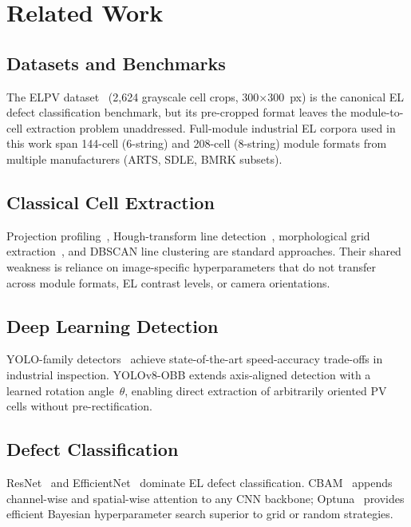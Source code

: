 \documentclass[conference]{IEEEtran}
\begin{document}
\section{Related Work}

\subsection{Datasets and Benchmarks}
The ELPV dataset~\cite{deitsch2019} (2{,}624 grayscale cell
crops, 300$\times$300~px) is the canonical EL defect
classification benchmark, but its pre-cropped format leaves
the module-to-cell extraction problem unaddressed.
Full-module industrial EL corpora used in this work span
144-cell (6-string) and 208-cell (8-string) module formats
from multiple manufacturers (ARTS, SDLE, BMRK subsets).

\subsection{Classical Cell Extraction}
Projection profiling~\cite{wong1982}, Hough-transform line
detection~\cite{duda1972}, morphological grid
extraction~\cite{soille2003}, and DBSCAN line clustering are
standard approaches. Their shared weakness is reliance on
image-specific hyperparameters that do not transfer across
module formats, EL contrast levels, or camera orientations.

\subsection{Deep Learning Detection}
YOLO-family detectors~\cite{redmon2016,jocher2023} achieve
state-of-the-art speed-accuracy trade-offs in industrial
inspection. YOLOv8-OBB extends axis-aligned detection with
a learned rotation angle~$\theta$, enabling direct extraction
of arbitrarily oriented PV cells without pre-rectification.

\subsection{Defect Classification}
ResNet~\cite{he2016} and EfficientNet~\cite{tan2019} dominate
EL defect classification. CBAM~\cite{woo2018} appends
channel-wise and spatial-wise attention to any CNN backbone;
Optuna~\cite{akiba2019} provides efficient Bayesian
hyperparameter search superior to grid or random strategies.
\end{document}
